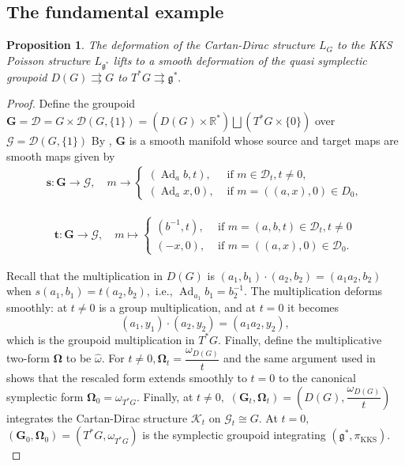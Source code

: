 \documentclass[reqno]{amsart}
\theoremstyle{plain}
\newtheorem{Prop}[Thm]{Proposition}
\theoremstyle{definition}
\newcommand{\R}{\mathbb{R}}
\newcommand{\G}{\mathcal{G}}
\newcommand{\g}{\mathfrak{g}}
\newcommand{\too}{\longrightarrow}
\newcommand{\mtoo}{\longmapsto}
\newcommand{\Ad}{\operatorname{Ad}}
\newcommand{\D}{\mathcal{D}}
\newcommand{\K}{\mathcal{K}}
\begin{document}
\subsection{The fundamental example}
\begin{Prop} \label{prop:fund}
    The deformation of the Cartan-Dirac structure $L_G$ to the KKS Poisson structure $L_{\g^{*}}$ lifts to a smooth deformation of the quasi symplectic groupoid $D(G) \rightrightarrows G$ to $T^{*}G \rightrightarrows \g^{*}.$
\end{Prop}

\begin{proof}
Define the groupoid $\mathbf{G} = \D =  G \times \D(G,\{1\}) = (D(G) \times \R^{*}) \bigsqcup (T^{*}G \times \{0\})$ over $\G = \D(G,\{1\})$ By \cite[Theorem 4.1]{burelle2026deformations}, $\mathbf{G}$ is a smooth manifold whose source and target maps are smooth maps given by 
    \begin{align*}
        \mathbf{s}: \mathbf{G} \too \G, \quad m \too \begin{cases}
            (\Ad_{a}b,t), & \text{ if } m \in \D_t, t\neq 0,\\
            (\Ad_{a}x,0),& \text{ if } m = ((a,x),0) \in D_0,
        \end{cases}
    \end{align*}

    \begin{align*}
        \mathbf{t}: \mathbf{G} \too \G, \quad m\mtoo \begin{cases}
            (b^{-1},t), & \text{ if } m = (a,b,t)\in \D_{t}, t\neq 0\\
            (-x,0),& \text{ if } m = ((a,x),0) \in \D_0.
        \end{cases}
    \end{align*}

Recall that the multiplication in $D(G)$ is $(a_1,b_1)\cdot (a_2,b_2) = (a_1a_2,b_2)$ when $s(a_1,b_1) = t(a_2,b_2),$ i.e., $\Ad_{a_1}b_1 = b_{2}^{-1}.$ The multiplication deforms smoothly: at $t \neq 0$ is a group multiplication, and at $t = 0$ it becomes \[
(a_1,y_1)\cdot (a_2,y_2) = (a_1a_2,y_2),
\]
which is the groupoid multiplication in $T^{*}G.$ Finally, define the multiplicative two-form $\mathbf{\Omega}$ to be $\widehat{\omega}.$ For $t \neq 0, \mathbf{\Omega}_t = \dfrac{\omega_{D(G)}}{t}$ and the same argument used in \cite[Theorem 4.3]{burelle2026deformations} shows that the rescaled form extends smoothly to $t = 0$ to the canonical symplectic form $\mathbf{\Omega}_0 = \omega_{T^{*}G}.$  Finally, at $t \neq 0,$ $(\mathbf{G}_t,\mathbf{\Omega}_t) = (D(G),\dfrac{\omega_{D(G)}}{t})$ integrates the Cartan-Dirac structure $\K_t$ on $\G_t \cong G.$ At $t = 0,$ $(\mathbf{G}_0,\mathbf{\Omega}_0) = (T^{*}G,\omega_{T^{*}G})$ is the symplectic groupoid integrating $(\g^{*},\pi_{\mathrm{KKS}}).$
\end{proof}
\end{document}
